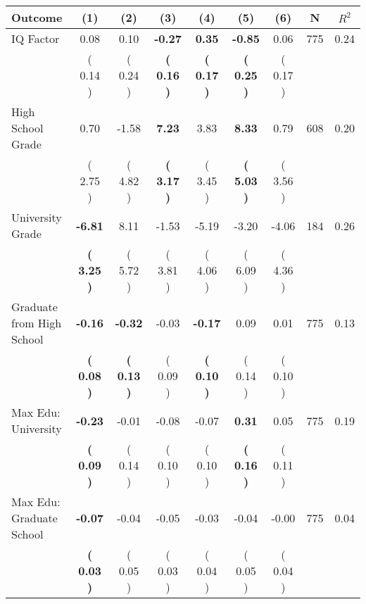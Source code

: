 \begin{tabular}{lcccccccc}
\toprule
 \textbf{Outcome} & \textbf{(1)} & \textbf{(2)} & \textbf{(3)} & \textbf{(4)} & \textbf{(5)} & \textbf{(6)} & \textbf{N} & \textbf{$ R^2$} \\
\midrule
IQ Factor &      0.08 &      0.10 & \textbf{    -0.27} & \textbf{     0.35} & \textbf{    -0.85} &      0.06 & 775 &       0.24 \\ 
 & (     0.14 ) & (     0.24 ) & \textbf{(     0.16 )} & \textbf{(     0.17 )} & \textbf{(     0.25 )} & (     0.17 ) & \\
High School Grade &      0.70 &     -1.58 & \textbf{     7.23} &      3.83 & \textbf{     8.33} &      0.79 & 608 &       0.20 \\ 
 & (     2.75 ) & (     4.82 ) & \textbf{(     3.17 )} & (     3.45 ) & \textbf{(     5.03 )} & (     3.56 ) & \\
University Grade & \textbf{    -6.81} &      8.11 &     -1.53 &     -5.19 &     -3.20 &     -4.06 & 184 &       0.26 \\ 
 & \textbf{(     3.25 )} & (     5.72 ) & (     3.81 ) & (     4.06 ) & (     6.09 ) & (     4.36 ) & \\
Graduate from High School & \textbf{    -0.16} & \textbf{    -0.32} &     -0.03 & \textbf{    -0.17} &      0.09 &      0.01 & 775 &       0.13 \\ 
 & \textbf{(     0.08 )} & \textbf{(     0.13 )} & (     0.09 ) & \textbf{(     0.10 )} & (     0.14 ) & (     0.10 ) & \\
Max Edu: University & \textbf{    -0.23} &     -0.01 &     -0.08 &     -0.07 & \textbf{     0.31} &      0.05 & 775 &       0.19 \\ 
 & \textbf{(     0.09 )} & (     0.14 ) & (     0.10 ) & (     0.10 ) & \textbf{(     0.16 )} & (     0.11 ) & \\
Max Edu: Graduate School & \textbf{    -0.07} &     -0.04 &     -0.05 &     -0.03 &     -0.04 &     -0.00 & 775 &       0.04 \\ 
 & \textbf{(     0.03 )} & (     0.05 ) & (     0.03 ) & (     0.04 ) & (     0.05 ) & (     0.04 ) & \\
\bottomrule
\end{tabular}
